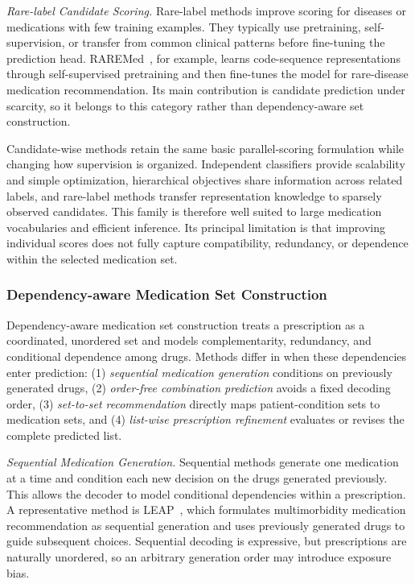 \documentclass[manuscript,review]{acmart}
\begin{document}
\textit{Rare-label Candidate Scoring.} Rare-label methods improve scoring for diseases or medications with few training examples. They typically use pretraining, self-supervision, or transfer from common clinical patterns before fine-tuning the prediction head. RAREMed~\cite{zhao2024raremed}, for example, learns code-sequence representations through self-supervised pretraining and then fine-tunes the model for rare-disease medication recommendation. Its main contribution is candidate prediction under scarcity, so it belongs to this category rather than dependency-aware set construction.

Candidate-wise methods retain the same basic parallel-scoring formulation while changing how supervision is organized. Independent classifiers provide scalability and simple optimization, hierarchical objectives share information across related labels, and rare-label methods transfer representation knowledge to sparsely observed candidates. This family is therefore well suited to large medication vocabularies and efficient inference. Its principal limitation is that improving individual scores does not fully capture compatibility, redundancy, or dependence within the selected medication set.

\subsubsection{Dependency-aware Medication Set Construction}

Dependency-aware medication set construction treats a prescription as a coordinated, unordered set and models complementarity, redundancy, and conditional dependence among drugs. Methods differ in when these dependencies enter prediction: (1) \textit{sequential medication generation} conditions on previously generated drugs, (2) \textit{order-free combination prediction} avoids a fixed decoding order, (3) \textit{set-to-set recommendation} directly maps patient-condition sets to medication sets, and (4) \textit{list-wise prescription refinement} evaluates or revises the complete predicted list.

\textit{Sequential Medication Generation.} Sequential methods generate one medication at a time and condition each new decision on the drugs generated previously. This allows the decoder to model conditional dependencies within a prescription. A representative method is LEAP~\cite{zhang2017leap}, which formulates multimorbidity medication recommendation as sequential generation and uses previously generated drugs to guide subsequent choices. Sequential decoding is expressive, but prescriptions are naturally unordered, so an arbitrary generation order may introduce exposure bias.
\end{document}
